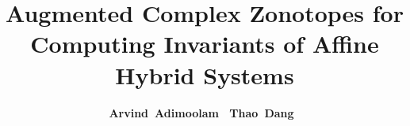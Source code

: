 




\title{Augmented Complex Zonotopes for Computing Invariants of Affine Hybrid Systems}
\author[shortname]{{ \bf \hspace{-1em} Arvind\ Adimoolam~\hspace{1em} Thao\ Dang~}}

\date{}



\maketitle

